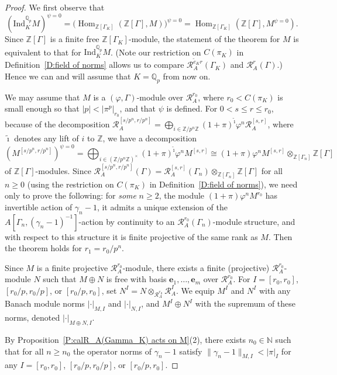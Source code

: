 \documentclass[12pt]{article}
\theoremstyle{definition}
\numberwithin{equation}{theorem}
\newcommand{\calR}{\mathcal{R}}
\newcommand{\QQ}{\mathbb{Q}}
\newcommand{\NN}{\mathbb{N}}
\newcommand{\ZZ}{\mathbb{Z}}
\newcommand{\bbe}{\mathbf{e}}
\newcommand{\Ind}{\mathrm{Ind}}
\def\Qp{\QQ_p}
\DeclareMathOperator{\Hom}{Hom}
\begin{document}
\begin{proof}
We first observe that
\[
(\Ind_K^{\Qp}M)^{\psi = 0} = \big(\Hom_{\ZZ[\Gamma_K]}(\ZZ[\Gamma], M)\big)^{\psi = 0} = \Hom_{\ZZ[\Gamma_K]}(\ZZ[\Gamma], M^{\psi = 0}).
\]
Since $\ZZ[\Gamma]$ is a finite free $\ZZ[\Gamma_K]$-module, the
statement of the theorem for $M$ is equivalent to that for
$\Ind_K^{\Qp}M$.  (Note our restriction on $C(\pi_K)$ in
Definition~\ref{D:field of norms} allows us to compare
$\calR_A^{\tilde e_Kr}(\Gamma_K)$ and $\calR_A^r(\Gamma)$.)
Hence we can and will assume that $K =\Qp$ from now on.

We may assume that $M$ is a $(\varphi,\Gamma)$-module over
$\calR_A^{r_0}$, where $r_0 < C(\pi_K)$ is small enough so that $|p| <
|\pi^p|_{r_0}$, and that $\psi$ is defined.  For $0 < s \leq r \leq
r_0$, because of the decomposition $\calR_A^{[s/p^n,r/p^n]} =
\bigoplus_{i \in \ZZ/p^n\ZZ}
(1+\pi)^{\tilde\imath}\varphi^n\calR_A^{[s,r]}$, where $\tilde\imath$
denotes any lift of $i$ to $\ZZ$, we have a decomposition
\[
(M^{[s/p^n, r/p^n]})^{\psi =0} = \bigoplus_{i \in (\ZZ/p^n\ZZ)^\times} (1+\pi)^{\tilde\imath} \varphi^n M^{[s,r]} \cong (1+\pi)\varphi^nM^{[s,r]} \otimes_{\ZZ[\Gamma_n]} \ZZ[\Gamma]
\]
of $\ZZ[\Gamma]$-modules.  Since $\calR_A^{[s/p^n, r/p^n]}(\Gamma) =
\calR_A^{[s,r]}(\Gamma_n) \otimes_{\ZZ[\Gamma_n]} \ZZ[\Gamma]$ for all
$n \geq 0$ (using the restriction on $C(\pi_K)$ in
Definition~\ref{D:field of norms}), we need only to prove the
following: for \emph{some} $n\geq 2$, the module
$(1+\pi)\varphi^nM^{r_0}$ has invertible action of $\gamma_n-1$, it
admits a unique extension of the
$A[\Gamma_n,(\gamma_n-1)^{-1}]$-action by continuity to an
$\calR_A^{r_0}(\Gamma_n)$-module structure, and with respect to this
structure it is finite projective of the same rank as $M$.  Then the
theorem holds for $r_1 = r_0/p^n$.

Since $M$ is a finite projective $\calR_A^{r_0}$-module, there exists a finite (projective) $\calR_A^{r_0}$-module $N$ such that $M \oplus N$ is free with basis $\bbe_1, \dots, \bbe_m$ over $\calR_A^{r_0}$.  For $I = [r_0, r_0]$, $[r_0/p, r_0/p]$, or $[r_0/p, r_0]$, set $N^I = N \otimes_{\calR_A^{r_0}} \calR_A^I$.
We equip $M^I$ and $N^I$ with any Banach module norms $|\cdot|_{M,I}$ and $|\cdot|_{N,I}$, and $M^I \oplus N^I$ with the supremum of these norms, denoted $|\cdot|_{M \oplus N,I}$.

By Proposition~\ref{P:calR_A(Gamma_K) acts on M}(2), there exists $n_0
\in \NN$ such that for all $n \geq n_0$ the operator norms of
$\gamma_n-1$ satisfy $\|\gamma_n-1\|_{M, I}< |\pi|_I$ for any $I =
    [r_0, r_0]$, $[r_0/p, r_0/p]$, or $[r_0/p, r_0]$.


\end{proof}
\end{document}
